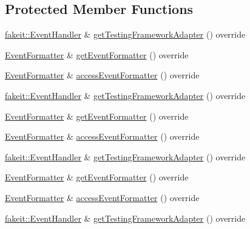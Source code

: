 \subsection*{Protected Member Functions}
\begin{DoxyCompactItemize}
\item 
\mbox{\hyperlink{structfakeit_1_1EventHandler}{fakeit\+::\+Event\+Handler}} \& \mbox{\hyperlink{classfakeit_1_1DefaultFakeit_af01d86eee74123b4794c07aac3767ad7}{get\+Testing\+Framework\+Adapter}} () override
\item 
\mbox{\hyperlink{structfakeit_1_1EventFormatter}{Event\+Formatter}} \& \mbox{\hyperlink{classfakeit_1_1DefaultFakeit_ae06b5536bcde628ed7e32499eb8b9ac3}{get\+Event\+Formatter}} () override
\item 
\mbox{\hyperlink{structfakeit_1_1EventFormatter}{Event\+Formatter}} \& \mbox{\hyperlink{classfakeit_1_1DefaultFakeit_a02cb8f08a94e7bf830c87f74f20c9bd9}{access\+Event\+Formatter}} () override
\item 
\mbox{\hyperlink{structfakeit_1_1EventHandler}{fakeit\+::\+Event\+Handler}} \& \mbox{\hyperlink{classfakeit_1_1DefaultFakeit_af01d86eee74123b4794c07aac3767ad7}{get\+Testing\+Framework\+Adapter}} () override
\item 
\mbox{\hyperlink{structfakeit_1_1EventFormatter}{Event\+Formatter}} \& \mbox{\hyperlink{classfakeit_1_1DefaultFakeit_ae06b5536bcde628ed7e32499eb8b9ac3}{get\+Event\+Formatter}} () override
\item 
\mbox{\hyperlink{structfakeit_1_1EventFormatter}{Event\+Formatter}} \& \mbox{\hyperlink{classfakeit_1_1DefaultFakeit_a02cb8f08a94e7bf830c87f74f20c9bd9}{access\+Event\+Formatter}} () override
\item 
\mbox{\hyperlink{structfakeit_1_1EventHandler}{fakeit\+::\+Event\+Handler}} \& \mbox{\hyperlink{classfakeit_1_1DefaultFakeit_af01d86eee74123b4794c07aac3767ad7}{get\+Testing\+Framework\+Adapter}} () override
\item 
\mbox{\hyperlink{structfakeit_1_1EventFormatter}{Event\+Formatter}} \& \mbox{\hyperlink{classfakeit_1_1DefaultFakeit_ae06b5536bcde628ed7e32499eb8b9ac3}{get\+Event\+Formatter}} () override
\item 
\mbox{\hyperlink{structfakeit_1_1EventFormatter}{Event\+Formatter}} \& \mbox{\hyperlink{classfakeit_1_1DefaultFakeit_a02cb8f08a94e7bf830c87f74f20c9bd9}{access\+Event\+Formatter}} () override
\item 
\mbox{\hyperlink{structfakeit_1_1EventHandler}{fakeit\+::\+Event\+Handler}} \& \mbox{\hyperlink{classfakeit_1_1DefaultFakeit_af01d86eee74123b4794c07aac3767ad7}{get\+Testing\+Framework\+Adapter}} () override

\end{DoxyCompactItemize}
